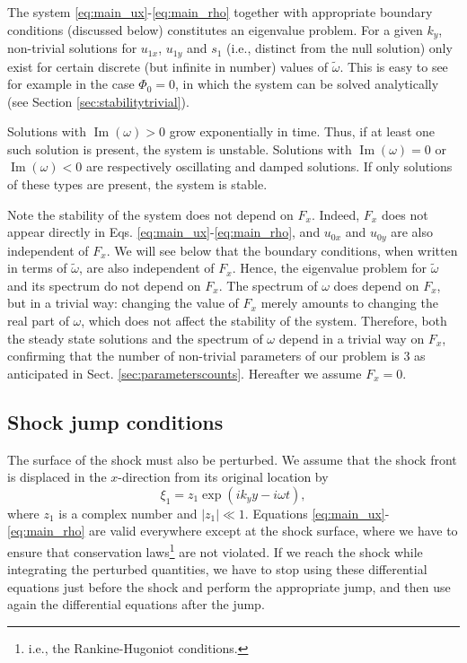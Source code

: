 \documentclass[useAMS,usenatbib]{mn2e}
\begin{document}
The system \eqref{eq:main_ux}-\eqref{eq:main_rho} together with appropriate boundary conditions (discussed below) constitutes an eigenvalue problem. For a given $k_y$, non-trivial solutions for $u_{1x}$, $u_{1y}$ and $s_1$ (i.e., distinct from the null solution) only exist for certain discrete (but infinite in number) values of $\tilde{\omega}$. This is easy to see for example in the case $\Phi_0=0$, in which the system can be solved analytically (see Section \ref{sec:stabilitytrivial}). 

Solutions with $\operatorname{Im}(\omega)>0$ grow exponentially in time. Thus, if at least one such solution is present, the system is unstable. Solutions with $\operatorname{Im}(\omega)=0$ or $\operatorname{Im}(\omega)<0$ are respectively oscillating and damped solutions. If only solutions of these types are present, the system is stable.

Note the stability of the system does not depend on $F_x$. Indeed, $F_x$ does not appear directly in Eqs. \eqref{eq:main_ux}-\eqref{eq:main_rho}, and $u_{0x}$ and $u_{0y}$ are also independent of $F_x$. We will see below that the boundary conditions, when written in terms of $\tilde{\omega}$, are also independent of $F_x$. Hence, the eigenvalue problem for $\tilde{\omega}$ and its spectrum do not depend on $F_x$. The spectrum of $\omega$ does depend on $F_x$, but in a trivial way: changing the value of $F_x$ merely amounts to changing the real part of $\omega$, which does not affect the stability of the system. Therefore, both the steady state solutions and the spectrum of $\omega$ depend in a trivial way on $F_x$, confirming that the number of non-trivial parameters of our problem is 3 as anticipated in Sect. \ref{sec:parameterscounts}. Hereafter we assume $F_x=0$.

\subsection{Shock jump conditions}
%
The surface of the shock must also be perturbed. We assume that the shock front is displaced in the $x$-direction from its original location by
\begin{equation}
\xi_1=z_1\exp\left( i k_y y - i \omega t \right),
\end{equation}
where $z_1$ is a complex number and $|z_1|\ll 1$. Equations \eqref{eq:main_ux}-\eqref{eq:main_rho} are valid everywhere except at the shock surface, where we have to ensure that conservation laws\footnote{i.e., the Rankine-Hugoniot conditions.} are not violated. If we reach the shock while integrating the perturbed quantities, we have to stop using these differential equations just before the shock and perform the appropriate jump, and then use again the differential equations after the jump. 
\end{document}
